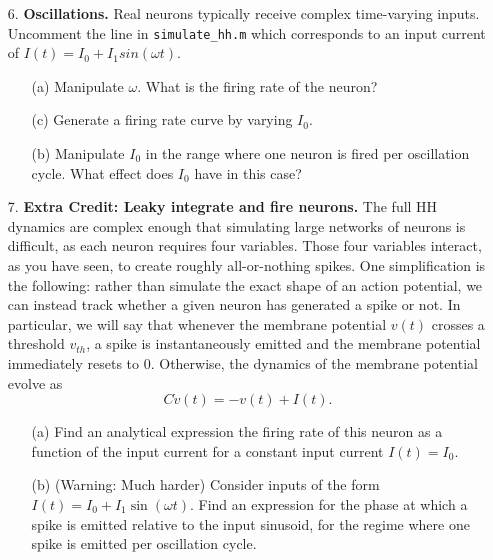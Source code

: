 \documentclass{article}
\begin{document}
\begin{itemize}
\item[]
\item[6.] \textbf{Oscillations.}
Real neurons typically receive complex time-varying inputs. Uncomment the line in  \verb|simulate_hh.m| which corresponds to an input current of $I(t)=I_0 + I_1sin(\omega t)$.
\begin{itemize}
\item[(a)]  Manipulate $\omega$. What is the firing rate of the neuron?
\item[(c)] Generate a firing rate curve by varying $I_0$.
\item[(b)]  Manipulate $I_0$ in the range where one neuron is fired per oscillation cycle. What effect does $I_0$ have in this case? 
\end{itemize}


\item[]
\item[7.] \textbf{Extra Credit: Leaky integrate and fire neurons.} The full HH dynamics are complex enough that simulating large networks of neurons is difficult, as each neuron requires four variables. Those four variables interact, as you have seen, to create roughly all-or-nothing spikes. One simplification is the following: rather than simulate the exact shape of an action potential, we can instead track whether a given neuron has generated a spike or not. In particular, we will say that whenever the membrane potential $v(t)$ crosses a threshold $v_{th}$, a spike is instantaneously emitted and the membrane potential immediately resets to $0$. Otherwise, the dynamics of the membrane potential evolve as 
\[ C \dot v(t) = -v(t)+I(t).\]
\begin{itemize}
\item[(a)] Find an analytical expression the firing rate of this neuron as a function of the input current for a constant input current $I(t)=I_0$. 
\item[(b)] (Warning: Much harder) Consider inputs of the form $I(t) = I_0 + I_1\sin(\omega t)$. Find an expression for the phase at which a spike is emitted relative to the input sinusoid, for the regime where one spike is emitted per oscillation cycle.
\end{itemize}
\end{itemize}
 
\end{document}
